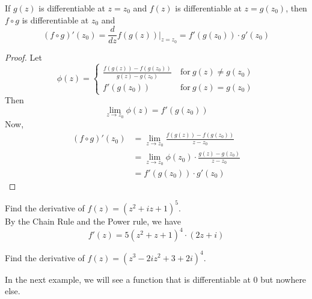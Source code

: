 \documentclass[handout]{ximera}
\begin{document}
\begin{theorem}
If $g(z)$ is differentiable at $z = z_0$ and $f(z)$ is differentiable at $z = g(z_0)$, then
$f \circ g$ is differentiable at $z_0$ and
\[
(f\circ g)'(z_0) = \frac{d}{dz} f(g(z)) \Big|_{z=z_0} = f'(g(z_0)) \cdot g'(z_0)
\]
\end{theorem}

\begin{proof}

Let
\[ \phi(z)  = \left\{
     \begin{array}{lr}
       \frac{f(g(z)) - f(g(z_0))}{g(z) -g(z_0)} & \ \text{for} \  g(z) \neq g(z_0) \\[12pt]
       f'(g(z_0)) & \ \text{for} \ g(z) = g(z_0)
     \end{array}
   \right.
\]
Then
\[
\lim_{z \to z_0} \phi(z) = f'(g(z_0))
\]
Now, 
\begin{align*}
(f\circ g)'(z_0) &= \lim_{z\to z_0} \frac{f(g(z)) - f(g(z_0))}{z-z_0} \\[10pt]
                 &= \lim_{z \to z_0} \phi(z_0) \cdot \frac{g(z) - g(z_0)}{z-z_0} \\[10pt]
                 &= f'(g(z_0)) \cdot g'(z_0)
\end{align*}

\end{proof}

\begin{example}
Find the derivative of $f(z) = (z^2 + iz + 1)^5$.\\
By the Chain Rule and the Power rule, we have
\[
f'(z) = 5(z^2 + z + 1)^4 \cdot (2z +i)
\]
\end{example}

\begin{problem}
Find the derivative of $f(z) = (z^3 - 2iz^2 + 3 + 2i)^4$.
\end{problem}
In the next example, we will see a function that is differentiable at $0$ but nowhere else.
\end{document}
